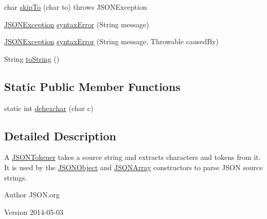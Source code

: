 \begin{DoxyCompactItemize}
\item 
char \hyperlink{classorg_1_1json_1_1JSONTokener_a780c7bb828073c40457b5692b06ec554}{skip\-To} (char to)  throws J\-S\-O\-N\-Exception 
\item 
\hyperlink{classorg_1_1json_1_1JSONException}{J\-S\-O\-N\-Exception} \hyperlink{classorg_1_1json_1_1JSONTokener_a467f559950c039f28394ce3a0d2659ca}{syntax\-Error} (String message)
\item 
\hyperlink{classorg_1_1json_1_1JSONException}{J\-S\-O\-N\-Exception} \hyperlink{classorg_1_1json_1_1JSONTokener_a4d116cc57ada3a673e24be779e1d3b5c}{syntax\-Error} (String message, Throwable caused\-By)
\item 
String \hyperlink{classorg_1_1json_1_1JSONTokener_a7015cb77bed5c6fdacfbfb7f2cf6effb}{to\-String} ()
\end{DoxyCompactItemize}
\subsection*{Static Public Member Functions}
\begin{DoxyCompactItemize}
\item 
static int \hyperlink{classorg_1_1json_1_1JSONTokener_a3ef8a20486fe58173ff9ac49e3dd7467}{dehexchar} (char c)
\end{DoxyCompactItemize}


\subsection{Detailed Description}
A \hyperlink{classorg_1_1json_1_1JSONTokener}{J\-S\-O\-N\-Tokener} takes a source string and extracts characters and tokens from it. It is used by the \hyperlink{classorg_1_1json_1_1JSONObject}{J\-S\-O\-N\-Object} and \hyperlink{classorg_1_1json_1_1JSONArray}{J\-S\-O\-N\-Array} constructors to parse J\-S\-O\-N source strings. \begin{DoxyAuthor}{Author}
J\-S\-O\-N.\-org 
\end{DoxyAuthor}
\begin{DoxyVersion}{Version}
2014-\/05-\/03 
\end{DoxyVersion}


